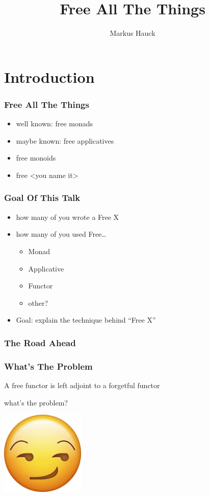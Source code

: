 \documentclass{beamer}
\title{Free All The Things}
\author{Markus Hauck}
\begin{document}
\begin{frame}
  \titlepage{}
\end{frame}

\section{Introduction}\label{sec:introduction}

\begin{frame}
\frametitle{Free All The Things}
\begin{itemize}
\item well known: free monads
\item maybe known: free applicatives
\item free monoids
\item free <you name it>
\end{itemize}
\end{frame}

\begin{frame}
  \frametitle{Goal Of This Talk}
  \begin{itemize}
  \item how many of you wrote a Free X
  \item how many of you used Free\ldots
    \begin{itemize}
    \item Monad
    \item Applicative
    \item Functor
    \item other?
    \end{itemize}
  \item Goal: explain the technique behind ``Free X''
  \end{itemize}
\end{frame}

\begin{frame}
  \frametitle{The Road Ahead}
\end{frame}

\begin{frame}
  \frametitle{What's The Problem}
  \begin{center}
    A free functor is left adjoint to a forgetful functor
  \end{center}
  \begin{center}
    what's the problem?
  \end{center}
  \begin{center}
    \includegraphics[width=0.3\textwidth]{static-images/smirk.png}
  \end{center}
\end{frame}
\end{document}
